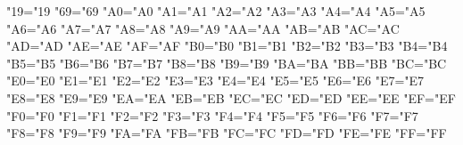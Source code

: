 \lccode"19="19 %
\lccode"69="69 %
\lccode"A0="A0 %
\lccode"A1="A1 %
\lccode"A2="A2 %
\lccode"A3="A3 %
\lccode"A4="A4 %
\lccode"A5="A5 %
\lccode"A6="A6 %
\lccode"A7="A7 %
\lccode"A8="A8 %
\lccode"A9="A9 %
\lccode"AA="AA %
\lccode"AB="AB %
\lccode"AC="AC %
\lccode"AD="AD %
\lccode"AE="AE %
\lccode"AF="AF %
\lccode"B0="B0 %
\lccode"B1="B1 %
\lccode"B2="B2 %
\lccode"B3="B3 %
\lccode"B4="B4 %
\lccode"B5="B5 %
\lccode"B6="B6 %
\lccode"B7="B7 %
\lccode"B8="B8 %
\lccode"B9="B9 %
\lccode"BA="BA %
\lccode"BB="BB %
\lccode"BC="BC %
\lccode"E0="E0 %
\lccode"E1="E1 %
\lccode"E2="E2 %
\lccode"E3="E3 %
\lccode"E4="E4 %
\lccode"E5="E5 %
\lccode"E6="E6 %
\lccode"E7="E7 %
\lccode"E8="E8 %
\lccode"E9="E9 %
\lccode"EA="EA %
\lccode"EB="EB %
\lccode"EC="EC %
\lccode"ED="ED %
\lccode"EE="EE %
\lccode"EF="EF %
\lccode"F0="F0 %
\lccode"F1="F1 %
\lccode"F2="F2 %
\lccode"F3="F3 %
\lccode"F4="F4 %
\lccode"F5="F5 %
\lccode"F6="F6 %
\lccode"F7="F7 %
\lccode"F8="F8 %
\lccode"F9="F9 %
\lccode"FA="FA %
\lccode"FB="FB %
\lccode"FC="FC %
\lccode"FD="FD %
\lccode"FE="FE %
\lccode"FF="FF %

